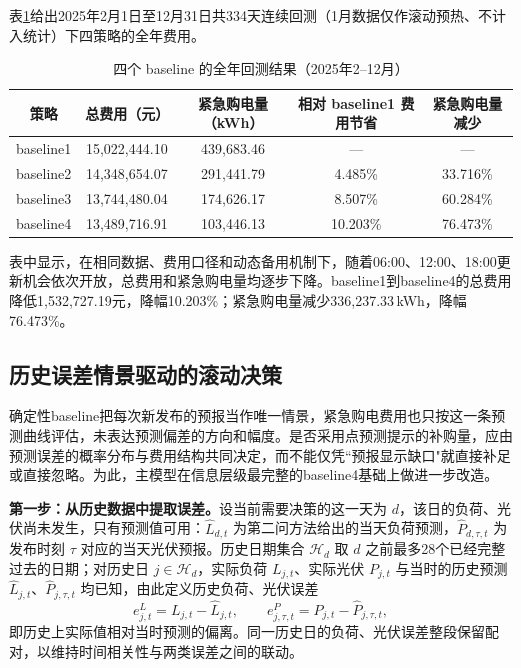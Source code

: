 表\ref{tab:q3-baseline-cost}给出2025年2月1日至12月31日共334天连续回测（1月数据仅作滚动预热、不计入统计）下四策略的全年费用。

\begin{table}[H]
  \centering
  \caption{四个 baseline 的全年回测结果（2025年2--12月）}
  \label{tab:q3-baseline-cost}
  \small
  \renewcommand{\arraystretch}{1.3}
  \begin{tabular}{|c|c|c|c|c|}
    \hline
    策略 & 总费用（元） & 紧急购电量（kWh） & 相对 baseline1 费用节省 & 紧急购电量减少 \\
    \hline
    baseline1 & 15{,}022{,}444.10 & 439{,}683.46 & --- & --- \\
    \hline
    baseline2 & 14{,}348{,}654.07 & 291{,}441.79 & 4.485\% & 33.716\% \\
    \hline
    baseline3 & 13{,}744{,}480.04 & 174{,}626.17 & 8.507\% & 60.284\% \\
    \hline
    baseline4 & 13{,}489{,}716.91 & 103{,}446.13 & 10.203\% & 76.473\% \\
    \hline
  \end{tabular}
\end{table}


表中显示，在相同数据、费用口径和动态备用机制下，随着06:00、12:00、18:00更新机会依次开放，总费用和紧急购电量均逐步下降。baseline1到baseline4的总费用降低1{,}532{,}727.19元，降幅10.203\%；紧急购电量减少336{,}237.33\,kWh，降幅76.473\%。

\subsection{历史误差情景驱动的滚动决策}
\label{sec:q3-scenario}
确定性baseline把每次新发布的预报当作唯一情景，紧急购电费用也只按这一条预测曲线评估，未表达预测偏差的方向和幅度。是否采用点预测提示的补购量，应由预测误差的概率分布与费用结构共同决定，而不能仅凭``预报显示缺口"就直接补足或直接忽略。为此，主模型在信息层级最完整的baseline4基础上做进一步改造。

\textbf{第一步：从历史数据中提取误差。}设当前需要决策的这一天为 $d$，该日的负荷、光伏尚未发生，只有预测值可用：$\widehat L_{d,t}$ 为第二问方法给出的当天负荷预测，$\widehat P_{d,\tau,t}$ 为发布时刻 $\tau$ 对应的当天光伏预报。历史日期集合 $\mathcal H_d$ 取 $d$ 之前最多28个已经完整过去的日期；对历史日 $j\in\mathcal H_d$，实际负荷 $L_{j,t}$、实际光伏 $P_{j,t}$ 与当时的历史预测 $\widehat L_{j,t}$、$\widehat P_{j,\tau,t}$ 均已知，由此定义历史负荷、光伏误差
\begin{equation}
e^L_{j,t}=L_{j,t}-\widehat L_{j,t},\qquad e^P_{j,\tau,t}=P_{j,t}-\widehat P_{j,\tau,t},
\end{equation}
即历史上实际值相对当时预测的偏离。同一历史日的负荷、光伏误差整段保留配对，以维持时间相关性与两类误差之间的联动。

